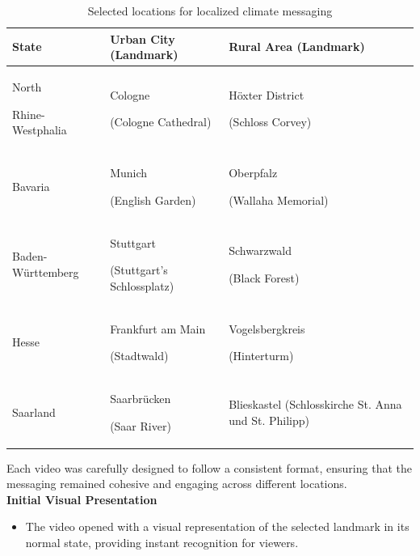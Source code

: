 \documentclass[a4paper,11pt]{article}
\begin{document}
\begin{table}[H]
\centering
\small %
\renewcommand{\arraystretch}{1.2} %
\setlength{\tabcolsep}{3pt} %

\begin{tabular}{|p{3.2cm}|p{4.5cm}|p{4.5cm}|} 
    \hline
    \textbf{State} & \textbf{Urban City (Landmark)} & \textbf{Rural Area (Landmark)} \\ \hline
    North 
    
    Rhine-Westphalia & Cologne 
    
    (Cologne Cathedral) & Höxter District 
    
    (Schloss Corvey) \\ \hline
    Bavaria & Munich 
    
    (English Garden) & Oberpfalz 
    
    (Wallaha Memorial) \\ \hline
    Baden-Württemberg & Stuttgart 
    
    (Stuttgart's Schlossplatz) & Schwarzwald 
    
    (Black Forest) \\ \hline
    Hesse & Frankfurt am Main 
    
    (Stadtwald) & Vogelsbergkreis 
    
    (Hinterturm) \\ \hline
    Saarland & Saarbrücken 
    
    (Saar River) & Blieskastel (Schlosskirche St. Anna und St. Philipp) \\ \hline
\end{tabular}

\caption{Selected locations for localized climate messaging}
\label{tab:selected_locations}
\end{table}





Each video was carefully designed to follow a consistent format, ensuring that the messaging remained cohesive and engaging across different locations. \\

\noindent \textbf{Initial Visual Presentation}
\begin{itemize}
    \item The video opened with a visual representation of the selected landmark in its normal state, providing instant recognition for viewers.
\end{itemize}
\end{document}
